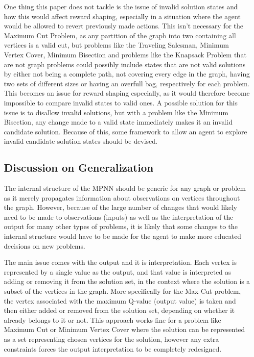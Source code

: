 \documentclass{article}
\begin{document}
One thing this paper does not tackle is the issue of invalid solution states and how this would affect reward shaping, especially in a situation where the agent would be allowed to revert previously made actions. This isn't necessary for the Maximum Cut Problem, as any partition of the graph into two containing all vertices is a valid cut, but problems like the Traveling Salesman, Minimum Vertex Cover, Minimum Bisection and problems like the Knapsack Problem that are not graph problems could possibly include states that are not valid solutions by either not being a complete path, not covering every edge in the graph, having two sets of different sizes or having an overfull bag, respectively for each problem. This becomes an issue for reward shaping especially, as it would therefore become impossible to compare invalid states to valid ones. A possible solution for this issue is to disallow invalid solutions, but with a problem like the Minimum Bisection, any change made to a valid state immediately makes it an invalid candidate solution. Because of this, some framework to allow an agent to explore invalid candidate solution states should be devised. 

\subsection{Discussion on Generalization}\label{sec:discussion-generalization-eco}

The internal structure of the MPNN should be generic for any graph or problem as it merely propagates information about observations on vertices throughout the graph. However, because of the large number of changes that would likely need to be made to observations (inputs) as well as the interpretation of the output for many other types of problems, it is likely that some changes to the internal structure would have to be made for the agent to make more educated decisions on new problems. 

The main issue comes with the output and it is interpretation. Each vertex is represented by a single value as the output, and that value is interpreted as adding or removing it from the solution set, in the context where the solution is a subset of the vertices in the graph. More specifically for the Max Cut problem, the vertex associated with the maximum Q-value (output value) is taken and then either added or removed from the solution set, depending on whether it already belongs to it or not. This approach works fine for a problem like Maximum Cut or Minimum Vertex Cover where the solution can be represented as a set representing chosen vertices for the solution, however any extra constraints forces the output interpretation to be completely redesigned. 
\end{document}
